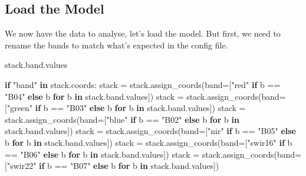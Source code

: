 \documentclass[
  letterpaper,
  DIV=11,
  numbers=noendperiod]{scrreprt}
\newenvironment{Shaded}{\begin{snugshade}}{\end{snugshade}}
\newcommand{\ControlFlowTok}[1]{\textcolor[rgb]{0.00,0.23,0.31}{\textbf{#1}}}
\newcommand{\KeywordTok}[1]{\textcolor[rgb]{0.00,0.23,0.31}{\textbf{#1}}}
\newcommand{\NormalTok}[1]{\textcolor[rgb]{0.00,0.23,0.31}{#1}}
\newcommand{\OperatorTok}[1]{\textcolor[rgb]{0.37,0.37,0.37}{#1}}
\newcommand{\StringTok}[1]{\textcolor[rgb]{0.13,0.47,0.30}{#1}}
\begin{document}
\subsection{Load the Model}\label{load-the-model-1}

We now have the data to analyse, let's load the model. But first, we
need to rename the bands to match what's expected in the config file.

\begin{Shaded}
\begin{Highlighting}[]
\NormalTok{stack.band.values}
\end{Highlighting}
\end{Shaded}

\begin{Shaded}
\begin{Highlighting}[]
\ControlFlowTok{if} \StringTok{"band"} \KeywordTok{in}\NormalTok{ stack.coords:}
\NormalTok{    stack }\OperatorTok{=}\NormalTok{ stack.assign\_coords(band}\OperatorTok{=}\NormalTok{[}\StringTok{"red"} \ControlFlowTok{if}\NormalTok{ b }\OperatorTok{==} \StringTok{"B04"} \ControlFlowTok{else}\NormalTok{ b }\ControlFlowTok{for}\NormalTok{ b }\KeywordTok{in}\NormalTok{ stack.band.values])}
\NormalTok{    stack }\OperatorTok{=}\NormalTok{ stack.assign\_coords(band}\OperatorTok{=}\NormalTok{[}\StringTok{"green"} \ControlFlowTok{if}\NormalTok{ b }\OperatorTok{==} \StringTok{"B03"} \ControlFlowTok{else}\NormalTok{ b }\ControlFlowTok{for}\NormalTok{ b }\KeywordTok{in}\NormalTok{ stack.band.values])}
\NormalTok{    stack }\OperatorTok{=}\NormalTok{ stack.assign\_coords(band}\OperatorTok{=}\NormalTok{[}\StringTok{"blue"} \ControlFlowTok{if}\NormalTok{ b }\OperatorTok{==} \StringTok{"B02"} \ControlFlowTok{else}\NormalTok{ b }\ControlFlowTok{for}\NormalTok{ b }\KeywordTok{in}\NormalTok{ stack.band.values])}
\NormalTok{    stack }\OperatorTok{=}\NormalTok{ stack.assign\_coords(band}\OperatorTok{=}\NormalTok{[}\StringTok{"nir"} \ControlFlowTok{if}\NormalTok{ b }\OperatorTok{==} \StringTok{"B05"} \ControlFlowTok{else}\NormalTok{ b }\ControlFlowTok{for}\NormalTok{ b }\KeywordTok{in}\NormalTok{ stack.band.values])}
\NormalTok{    stack }\OperatorTok{=}\NormalTok{ stack.assign\_coords(band}\OperatorTok{=}\NormalTok{[}\StringTok{"swir16"} \ControlFlowTok{if}\NormalTok{ b }\OperatorTok{==} \StringTok{"B06"} \ControlFlowTok{else}\NormalTok{ b }\ControlFlowTok{for}\NormalTok{ b }\KeywordTok{in}\NormalTok{ stack.band.values])}
\NormalTok{    stack }\OperatorTok{=}\NormalTok{ stack.assign\_coords(band}\OperatorTok{=}\NormalTok{[}\StringTok{"swir22"} \ControlFlowTok{if}\NormalTok{ b }\OperatorTok{==} \StringTok{"B07"} \ControlFlowTok{else}\NormalTok{ b }\ControlFlowTok{for}\NormalTok{ b }\KeywordTok{in}\NormalTok{ stack.band.values])}
\end{Highlighting}
\end{Shaded}
\end{document}
